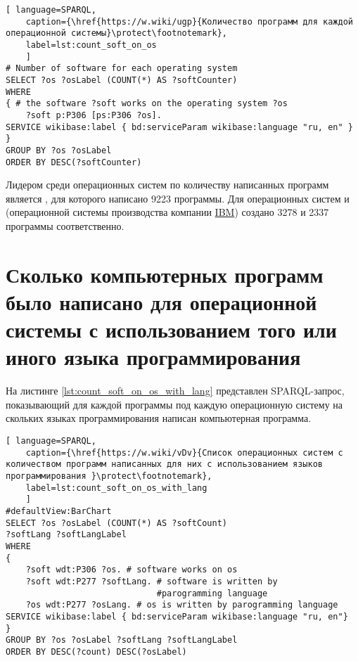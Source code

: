 \begin{lstlisting}[ language=SPARQL, 
	caption={\href{https://w.wiki/ugp}{Количество программ для каждой операционной системы}\protect\footnotemark},
	label=lst:count_soft_on_os
	]
# Number of software for each operating system
SELECT ?os ?osLabel (COUNT(*) AS ?softCounter)
WHERE
{ # the software ?soft works on the operating system ?os
	?soft p:P306 [ps:P306 ?os].
SERVICE wikibase:label { bd:serviceParam wikibase:language "ru, en" }
}
GROUP BY ?os ?osLabel
ORDER BY DESC(?softCounter)
\end{lstlisting}

Лидером среди операционных систем по количеству написанных программ является , для которого написано \num{9223} программы. Для операционных систем  и   (операционной системы производства компании \href{https://www.wikidata.org/wiki/Q37156}{IBM}) создано \num{3278} и \num{2337} программы соответственно.

\section{Сколько компьютерных программ было написано для операционной системы с использованием того или иного языка программирования}
На листинге \ref{lst:count_soft_on_os_with_lang} представлен SPARQL-запрос, показывающий для каждой программы под каждую операционную систему на скольких языках программирования написан компьютерная программа.

\begin{lstlisting}[ language=SPARQL, 
	caption={\href{https://w.wiki/vDv}{Список операционных систем с количеством программ написанных для них с использованием языков программирования }\protect\footnotemark},
	label=lst:count_soft_on_os_with_lang
	]
#defaultView:BarChart
SELECT ?os ?osLabel (COUNT(*) AS ?softCount)
?softLang ?softLangLabel
WHERE
{
	?soft wdt:P306 ?os. # software works on os
	?soft wdt:P277 ?softLang. # software is written by 
	                          #parogramming language
	?os wdt:P277 ?osLang. # os is written by parogramming language
SERVICE wikibase:label { bd:serviceParam wikibase:language "ru, en"}
}
GROUP BY ?os ?osLabel ?softLang ?softLangLabel
ORDER BY DESC(?count) DESC(?osLabel)
\end{lstlisting}

